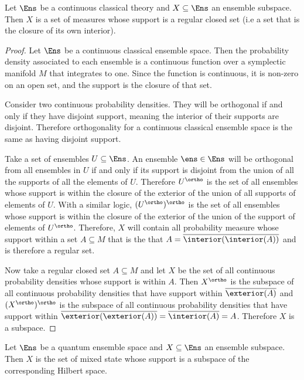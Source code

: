 \begin{prop}
	Let $\Ens$ be a continuous classical theory and $X \subseteq \Ens$ an ensemble subspace. Then $X$ is a set of measures whose support is a regular closed set (i.e a set that is the closure of its own interior).
\end{prop}

\begin{proof}
	Let $\Ens$ be a continuous classical ensemble space. Then the probability density associated to each ensemble is a continuous function over a symplectic manifold $M$ that integrates to one. Since the function is continuous, it is non-zero on an open set, and the support is the closure of that set.
	
	Consider two continuous probability densities. They will be orthogonal if and only if they have disjoint support, meaning the interior of their supports are disjoint. Therefore orthogonality for a continuous classical ensemble space is the same as having disjoint support.
	
	Take a set of ensembles $U \subseteq \Ens$. An ensemble $\ens \in \Ens$ will be orthogonal from all ensembles in $U$ if and only if its support is disjoint from the union of all the supports of all the elements of $U$. Therefore $U^\ortho$ is the set of all ensembles whose support is within the closure of the exterior of the union of all supports of elements of $U$. With a similar logic, $(U^\ortho)^\ortho$ is the set of all ensembles whose support is within the closure of the exterior of the union of the support of elements of $U^\ortho$. Therefore, $X$ will contain all probability measure whose support within a set $A \subseteq M$ that is the that $A = \overline{\interior(\interior(A))}$ and is therefore a regular set.
	
	Now take a regular closed set $A \subseteq M$ and let $X$ be the set of all continuous probability densities whose support is within $A$. Then $X^\ortho$ is the subspace of all continuous probability densities that have support within $\overline{\exterior(A)}$ and $(X^\ortho)^\ortho$ is the subspace of all continuous probability densities that have support within $\overline{\exterior(\exterior(A))} = \overline{\interior(A)} = A$. Therefore $X$ is a subspace.
\end{proof}

\begin{prop}
	Let $\Ens$ be a quantum ensemble space and $X \subseteq \Ens$ an ensemble subspace. Then $X$ is the set of mixed state whose support is a subspace of the corresponding Hilbert space.
\end{prop}

